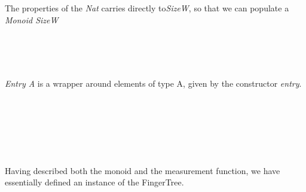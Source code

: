 \documentclass[12pt,twoside,notitlepage]{report}
\begin{document}
The properties of the \textit{Nat} carries directly to\textit{SizeW}, so that we can populate a \textit{Monoid SizeW}

\begin{code}
\\
\>[0]\<[2]%
\>[2]  \AgdaSymbol{:}  \AgdaSymbol{\{}\AgdaSymbol{\}}   \AgdaSymbol{(} \AgdaSymbol{\{}\AgdaSymbol{\})}\<%
\\
\>[0]\<[2]%
\>[2] \AgdaSymbol{=}       \<%
\\
\end{code}

\textit{Entry A} is a wrapper around elements of type A, given by the constructor \textit{entry}.


\begin{code}
\\
\>[0]\<[2]%
\>[2] \AgdaSymbol{:}  \AgdaSymbol{\{}\AgdaSymbol{\}\{} \AgdaSymbol{:}  \AgdaSymbol{\}}  \AgdaSymbol{(} \AgdaSymbol{:}  \AgdaSymbol{)}   \AgdaSymbol{\{}\AgdaSymbol{\}}\<%
\\
\>[0]\<[2]%
\>[2]  \AgdaSymbol{=}  \<%
\\
%
\\
\>[0]\<[2]%
\>[2]  \AgdaSymbol{:} \AgdaSymbol{\}\{} \AgdaSymbol{:}  \AgdaSymbol{\}}   \AgdaSymbol{(} \AgdaSymbol{)} \<%
\\
\>[0]\<[2]%
\>[2] \AgdaSymbol{=}  \<%
\end{code}

Having described both the monoid and the measurement function, we have essentially defined an instance of the FingerTree.
\end{document}
